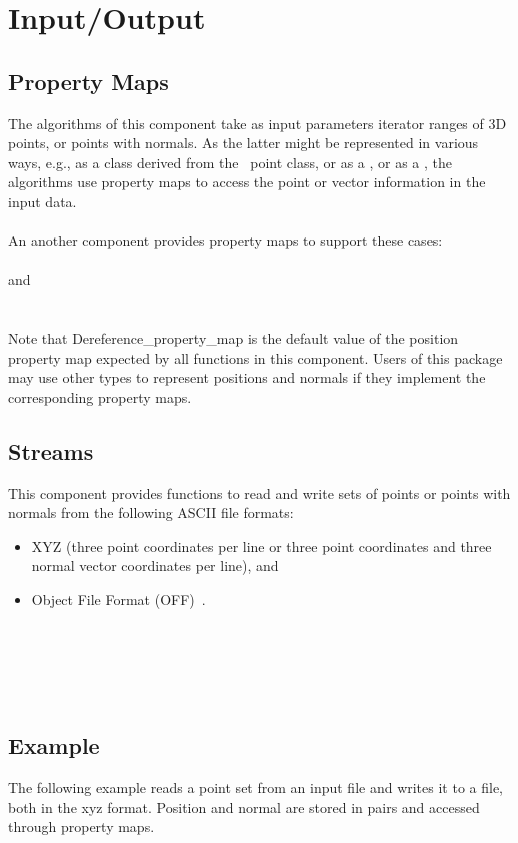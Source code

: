 \section{Input/Output}


\subsection{Property Maps}

The algorithms of this component take as input parameters iterator ranges of 3D points, or points with normals.
As the latter might be represented in various ways, e.g., as a class derived from the \cgal\ point class, or as a
, or as a , the
algorithms use property maps to access the point or vector information in the input data.  \\
\\
An another component provides property maps to support these cases:  \\
  \\
 and   \\
  \\
\\
Note that Dereference_property_map is the default value of the position property map expected by all functions in this component.
Users of this package may use other types to represent positions and normals if they implement the corresponding property maps.


\subsection{Streams}

This component provides functions to read and write sets of points or points with normals from the following ASCII file formats:
\begin{itemize}
\item XYZ (three point coordinates  per line or three point coordinates and three normal vector coordinates  per line), and \\
\item Object File Format (OFF)~\cite{cgal:p-gmgv16-96}.
\end{itemize}

  \\
  \\
  \\
  \\


\subsection{Example}

The following example reads a point set from an input file and writes it to a file, both in the xyz format. Position and normal are stored in pairs and accessed through property maps.
